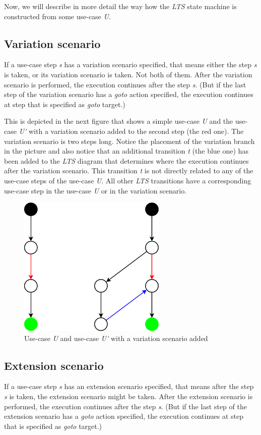 Now, we will describe in more detail the way how the \emph{LTS} state machine is constructed from some use-case \emph{U}.

\subsection{Variation scenario}
If a use-case step \emph{s} has a variation scenario specified, that means either the step \emph{s} is taken, or its variation scenario is
taken. Not both of them. After the variation scenario is performed, the execution continues after the step \emph{s}. (But if the
last step of the variation scenario has a \emph{goto} action specified, the execution continues at step that is specified as
\emph{goto} target.)

This is depicted in the next figure that shows a simple use-case \emph{U} and the use-case \emph{U\'} with a variation
scenario added to the second step (the red one). The variation scenario is two steps long.
Notice the placement of the variation branch in the picture and also notice that an additional transition \emph{t} (the blue one)
has been added to the \emph{LTS} diagram that determines where the execution continues after the variation scenario. This transition
\emph{t} is not directly related to any of the use-case steps of the use-case \emph{U}. All other \emph{LTS} transitions have a
corresponding use-case step in the use-case \emph{U} or in the variation scenario.

\begin{figure}[ht]
  \centering
  \includegraphics[width=200pt]{images/variation}
  \caption{Use-case \emph{U} and use-case \emph{U\'} with a variation scenario added}
  \label{fig:VariationScenario}
\end{figure}

\subsection{Extension scenario}
If a use-case step \emph{s} has an extension scenario specified, that means after the step \emph{s} is taken, the extension scenario
might be taken. After the extension scenario is performed, the execution continues after the step \emph{s}. (But if the
last step of the extension scenario has a \emph{goto} action specified, the execution continues at step that is specified as
\emph{goto} target.)

